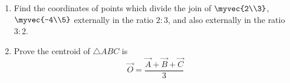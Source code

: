 \begin{enumerate}[label=\arabic*.,ref=\thesubsection.\theenumi]
\item Find the coordinates of  points which divide the join of $\myvec{2\\3}$, $\myvec{-4\\5}$ externally in the ratio $2:3$, and also
externally in the ratio $3:2$.
\item Prove the centroid of $\triangle ABC$ is
\begin{equation}
\vec{O}=\frac{\vec{A}+\vec{B}+\vec{C}}{3}
\end{equation}

\end{enumerate}
%

% 
% 
%




